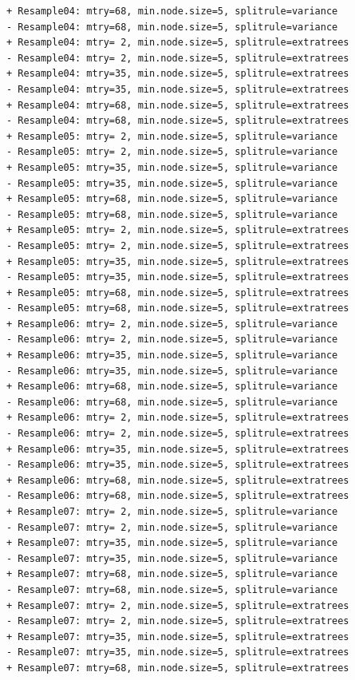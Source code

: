 \documentclass[
  letterpaper,
  DIV=11,
  numbers=noendperiod]{scrartcl}
\begin{document}
\begin{verbatim}
+ Resample04: mtry=68, min.node.size=5, splitrule=variance 
- Resample04: mtry=68, min.node.size=5, splitrule=variance 
+ Resample04: mtry= 2, min.node.size=5, splitrule=extratrees 
- Resample04: mtry= 2, min.node.size=5, splitrule=extratrees 
+ Resample04: mtry=35, min.node.size=5, splitrule=extratrees 
- Resample04: mtry=35, min.node.size=5, splitrule=extratrees 
+ Resample04: mtry=68, min.node.size=5, splitrule=extratrees 
- Resample04: mtry=68, min.node.size=5, splitrule=extratrees 
+ Resample05: mtry= 2, min.node.size=5, splitrule=variance 
- Resample05: mtry= 2, min.node.size=5, splitrule=variance 
+ Resample05: mtry=35, min.node.size=5, splitrule=variance 
- Resample05: mtry=35, min.node.size=5, splitrule=variance 
+ Resample05: mtry=68, min.node.size=5, splitrule=variance 
- Resample05: mtry=68, min.node.size=5, splitrule=variance 
+ Resample05: mtry= 2, min.node.size=5, splitrule=extratrees 
- Resample05: mtry= 2, min.node.size=5, splitrule=extratrees 
+ Resample05: mtry=35, min.node.size=5, splitrule=extratrees 
- Resample05: mtry=35, min.node.size=5, splitrule=extratrees 
+ Resample05: mtry=68, min.node.size=5, splitrule=extratrees 
- Resample05: mtry=68, min.node.size=5, splitrule=extratrees 
+ Resample06: mtry= 2, min.node.size=5, splitrule=variance 
- Resample06: mtry= 2, min.node.size=5, splitrule=variance 
+ Resample06: mtry=35, min.node.size=5, splitrule=variance 
- Resample06: mtry=35, min.node.size=5, splitrule=variance 
+ Resample06: mtry=68, min.node.size=5, splitrule=variance 
- Resample06: mtry=68, min.node.size=5, splitrule=variance 
+ Resample06: mtry= 2, min.node.size=5, splitrule=extratrees 
- Resample06: mtry= 2, min.node.size=5, splitrule=extratrees 
+ Resample06: mtry=35, min.node.size=5, splitrule=extratrees 
- Resample06: mtry=35, min.node.size=5, splitrule=extratrees 
+ Resample06: mtry=68, min.node.size=5, splitrule=extratrees 
- Resample06: mtry=68, min.node.size=5, splitrule=extratrees 
+ Resample07: mtry= 2, min.node.size=5, splitrule=variance 
- Resample07: mtry= 2, min.node.size=5, splitrule=variance 
+ Resample07: mtry=35, min.node.size=5, splitrule=variance 
- Resample07: mtry=35, min.node.size=5, splitrule=variance 
+ Resample07: mtry=68, min.node.size=5, splitrule=variance 
- Resample07: mtry=68, min.node.size=5, splitrule=variance 
+ Resample07: mtry= 2, min.node.size=5, splitrule=extratrees 
- Resample07: mtry= 2, min.node.size=5, splitrule=extratrees 
+ Resample07: mtry=35, min.node.size=5, splitrule=extratrees 
- Resample07: mtry=35, min.node.size=5, splitrule=extratrees 
+ Resample07: mtry=68, min.node.size=5, splitrule=extratrees 

\end{verbatim}
\end{document}
